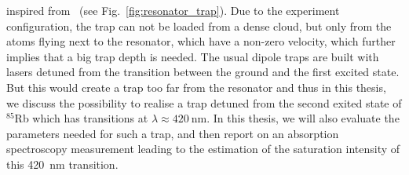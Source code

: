 inspired from~\cite{Thompson1202} (see Fig.~\ref{fig:resonator_trap}). Due to the 
experiment configuration, the trap can not be loaded from a dense cloud, but only 
from the atoms flying next to the resonator, which have a non-zero velocity, which 
further implies that a big trap depth is needed. The usual dipole traps are built 
with lasers detuned from the transition between the ground and the first excited 
state. But this would create a trap too far from the resonator and thus in this 
thesis, we discuss the possibility to realise a trap detuned from the second exited 
state of \(^{85}\)Rb which has transitions at \(\lambda \approx \SI{420}{\nano\meter} \).
In this thesis, we will also evaluate the parameters needed for such a trap, and 
then report on an absorption spectroscopy measurement leading to the estimation 
of the saturation intensity of this \SI{420}{\nano\meter} transition.